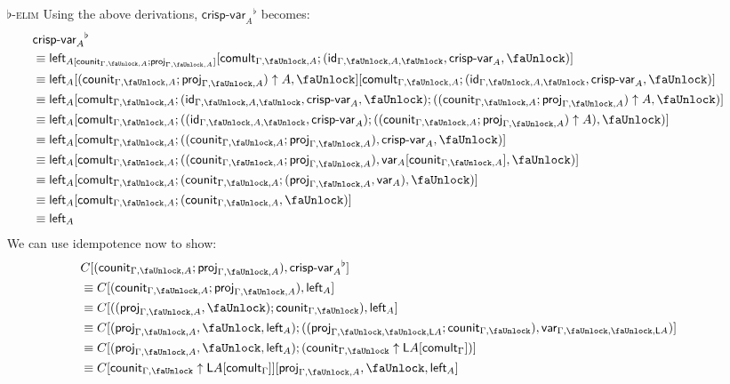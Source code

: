 \documentclass[10pt]{article}
\theoremstyle{definition}
\newcommand{\id}{\mathsf{id}}
\newcommand\proj[1]{\ensuremath{\mathsf{proj}_{#1}}}
\newcommand\qvar[1]{\ensuremath{\mathsf{var}_{#1}}}
\newcommand{\lock}{\text{\faUnlock}}
\newcommand{\Ltype}[1]{\mathsf{L}{#1}}
\newcommand{\LI}[1]{\mathsf{left}_{#1}}
\newcommand{\counit}[1]{\mathsf{counit}_{#1}}
\newcommand{\comult}[1]{\mathsf{comult}_{#1}}
\newcommand{\FlatI}[1]{{#1}^\flat}
\newcommand\qcrispvar[1]{\ensuremath{\textsf{crisp-var}_{#1}}}
\begin{document}
\begin{enumerate}
\item[\textsc{$\flat$-elim}]
Using the above derivations, $\FlatI{\qcrispvar{A}}$ becomes:
\begin{align*}
&\FlatI{\qcrispvar{A}} \\
&\equiv \LI{A[\counit{\Gamma, \lock, A};\proj{\Gamma, \lock, A}]}[\comult{\Gamma, \lock, A};(\id_{\Gamma, \lock, A, \lock}, \qcrispvar{A}, \lock)] \\
&\equiv \LI{A}[(\counit{\Gamma, \lock, A};\proj{\Gamma, \lock, A}) \uparrow A, \lock][\comult{\Gamma, \lock, A};(\id_{\Gamma, \lock, A, \lock}, \qcrispvar{A}, \lock)] \\
&\equiv \LI{A}[\comult{\Gamma, \lock, A};(\id_{\Gamma, \lock, A, \lock}, \qcrispvar{A}, \lock);((\counit{\Gamma, \lock, A};\proj{\Gamma, \lock, A}) \uparrow A, \lock)] \\
&\equiv \LI{A}[\comult{\Gamma, \lock, A};((\id_{\Gamma, \lock, A, \lock}, \qcrispvar{A});((\counit{\Gamma, \lock, A};\proj{\Gamma, \lock, A}) \uparrow A), \lock)] \\
&\equiv \LI{A}[\comult{\Gamma, \lock, A};((\counit{\Gamma, \lock, A};\proj{\Gamma, \lock, A}), \qcrispvar{A}, \lock)] \\
&\equiv \LI{A}[\comult{\Gamma, \lock, A};((\counit{\Gamma, \lock, A};\proj{\Gamma, \lock, A}), \qvar{A}[\counit{\Gamma, \lock, A}], \lock)] \\
&\equiv \LI{A}[\comult{\Gamma, \lock, A};(\counit{\Gamma, \lock, A};(\proj{\Gamma, \lock, A}, \qvar{A}), \lock)] \\
&\equiv \LI{A}[\comult{\Gamma, \lock, A};(\counit{\Gamma, \lock, A}, \lock)] \\
&\equiv \LI{A}
\end{align*}
We can use idempotence now to show:
\begin{align*}
&C[(\counit{\Gamma, \lock, A} ; \proj{\Gamma, \lock, A}), \FlatI{\qcrispvar{A}}] \\
&\equiv C[(\counit{\Gamma, \lock, A} ; \proj{\Gamma, \lock, A}), \LI{A}] \\
&\equiv C[( (\proj{\Gamma, \lock, A}, \lock) ; \counit{\Gamma, \lock}), \LI{A}] \\
&\equiv C[(\proj{\Gamma, \lock, A}, \lock, \LI{A});((\proj{\Gamma, \lock, \lock, \Ltype{A}}; \counit{\Gamma, \lock}) , \qvar{\Gamma,\lock,\lock, \Ltype{A}})] \\
&\equiv C[(\proj{\Gamma, \lock, A}, \lock, \LI{A});(\counit{\Gamma, \lock} \uparrow \Ltype{A}[\comult{\Gamma}])] \\
&\equiv C[\counit{\Gamma, \lock} \uparrow \Ltype{A}[\comult{\Gamma}]][\proj{\Gamma, \lock, A}, \lock, \LI{A}]

\end{align*}
\end{enumerate}
\end{document}
